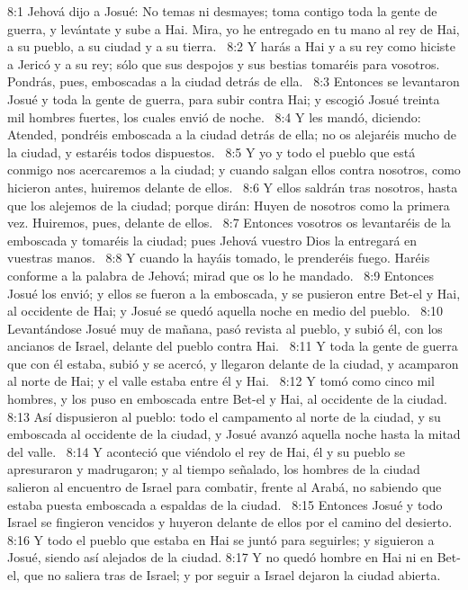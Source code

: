 8:1 Jehová dijo a Josué: No temas ni desmayes; toma contigo toda la gente de guerra, y levántate y sube a Hai. Mira, yo he entregado en tu mano al rey de Hai, a su pueblo, a su ciudad y a su tierra.  
8:2 Y harás a Hai y a su rey como hiciste a Jericó y a su rey; sólo que sus despojos y sus bestias tomaréis para vosotros. Pondrás, pues, emboscadas a la ciudad detrás de ella.  
8:3 Entonces se levantaron Josué y toda la gente de guerra, para subir contra Hai; y escogió Josué treinta mil hombres fuertes, los cuales envió de noche.  
8:4 Y les mandó, diciendo: Atended, pondréis emboscada a la ciudad detrás de ella; no os alejaréis mucho de la ciudad, y estaréis todos dispuestos.  
8:5 Y yo y todo el pueblo que está conmigo nos acercaremos a la ciudad; y cuando salgan ellos contra nosotros, como hicieron antes, huiremos delante de ellos.  
8:6 Y ellos saldrán tras nosotros, hasta que los alejemos de la ciudad; porque dirán: Huyen de nosotros como la primera vez. Huiremos, pues, delante de ellos.  
8:7 Entonces vosotros os levantaréis de la emboscada y tomaréis la ciudad; pues Jehová vuestro Dios la entregará en vuestras manos.  
8:8 Y cuando la hayáis tomado, le prenderéis fuego. Haréis conforme a la palabra de Jehová; mirad que os lo he mandado.  
8:9 Entonces Josué los envió; y ellos se fueron a la emboscada, y se pusieron entre Bet-el y Hai, al occidente de Hai; y Josué se quedó aquella noche en medio del pueblo.  
8:10 Levantándose Josué muy de mañana, pasó revista al pueblo, y subió él, con los ancianos de Israel, delante del pueblo contra Hai.  
8:11 Y toda la gente de guerra que con él estaba, subió y se acercó, y llegaron delante de la ciudad, y acamparon al norte de Hai; y el valle estaba entre él y Hai.  
8:12 Y tomó como cinco mil hombres, y los puso en emboscada entre Bet-el y Hai, al occidente de la ciudad.  
8:13 Así dispusieron al pueblo: todo el campamento al norte de la ciudad, y su emboscada al occidente de la ciudad, y Josué avanzó aquella noche hasta la mitad del valle.  
8:14 Y aconteció que viéndolo el rey de Hai, él y su pueblo se apresuraron y madrugaron; y al tiempo señalado, los hombres de la ciudad salieron al encuentro de Israel para combatir, frente al Arabá, no sabiendo que estaba puesta emboscada a espaldas de la ciudad.  
8:15 Entonces Josué y todo Israel se fingieron vencidos y huyeron delante de ellos por el camino del desierto.  
8:16 Y todo el pueblo que estaba en Hai se juntó para seguirles; y siguieron a Josué, siendo así alejados de la ciudad. 
8:17 Y no quedó hombre en Hai ni en Bet-el, que no saliera tras de Israel; y por seguir a Israel dejaron la ciudad abierta.  
